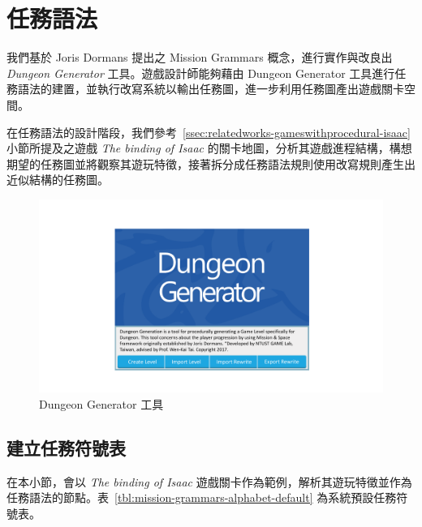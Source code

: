 \section{任務語法}
\label{sec:method-missiongrammars}

我們基於 Joris Dormans 提出之 Mission Grammars 概念，進行實作與改良出 \textit{Dungeon Generator} 工具。遊戲設計師能夠藉由 Dungeon Generator 工具進行任務語法的建置，並執行改寫系統以輸出任務圖，進一步利用任務圖產出遊戲關卡空間。

在任務語法的設計階段，我們參考~\ref{ssec:relatedworks-gameswithprocedural-isaac} 小節所提及之遊戲 \textit{The binding of Isaac} 的關卡地圖，分析其遊戲進程結構，構想期望的任務圖並將觀察其遊玩特徵，接著拆分成任務語法規則使用改寫規則產生出近似結構的任務圖。

\begin{figure}[!htb]
  \begin{center}
    \includegraphics[width=1.0\textwidth]{figures/dungeon_generator.pdf}
    \caption{Dungeon Generator 工具} 
    \label{fig:dungeon-generator}
  \end{center}
\end{figure}

\subsection{建立任務符號表}
\label{ssec:method-missiongrammars-alphabet}

在本小節，會以 \textit{The binding of Isaac} 遊戲關卡作為範例，解析其遊玩特徵並作為任務語法的節點。表~\ref{tbl:mission-grammars-alphabet-default} 為系統預設任務符號表。


